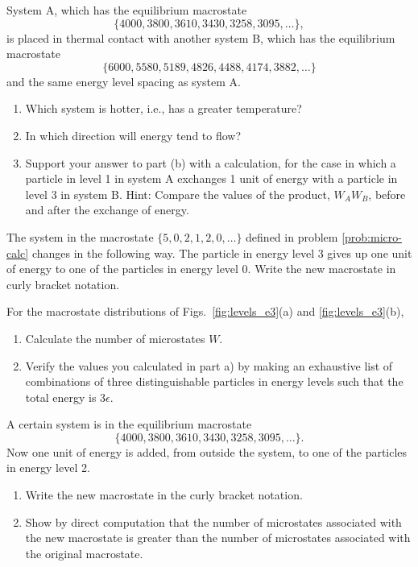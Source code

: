 \begin{problem}
  System A, which has the equilibrium macrostate 
  \[\{4000, 3800, 3610,3430, 3258,3095, \dots\},\] 
   is placed in thermal contact with another
  system B, which has the equilibrium macrostate 
  \[\{6000, 5580, 5189,4826, 4488, 4174, 3882, \dots\}\] 
   and the same energy level spacing
  as system A.
  \begin{enumerate}
  \item Which system is hotter, i.e., has a greater temperature?
  \item In which direction will energy tend to flow?
  \item Support your answer to part (b) with a calculation, for the
    case in which a particle in level 1 in system A exchanges 1 unit
    of energy with a particle in level 3 in system B.  Hint: Compare
    the values of the product, $W_AW_B$, before and after the exchange
    of energy.
  \end{enumerate}
  \label{prob:systemsAB}
\end{problem}


\begin{problem}
  The system in the macrostate $\{5, 0, 2, 1, 2, 0, \dots\}$ defined
  in problem \ref{prob:micro-calc} changes in the following way.  The
  particle in energy level 3 gives up one unit of energy to one of the
  particles in energy level 0.  Write the new macrostate in curly
  bracket notation.
  \label{prob:new_macrostate}
\end{problem}

\begin{problem}
  For the macrostate distributions of Figs.~\ref{fig:levels_e3}(a) and
  \ref{fig:levels_e3}(b),
  \begin{enumerate}
  \item Calculate the number of microstates $W$.
  \item Verify the values you calculated in part a) by making an
    exhaustive list of combinations of three distinguishable particles
    in energy levels such that the total energy is 3$\epsilon$.
  \end{enumerate}
  \label{prob:exhaustive_list}
\end{problem}



\begin{problem}
  A certain system is in the equilibrium macrostate 
  \[\{4000, 3800,3610, 3430, 3258, 3095, \dots\}.\]  
   Now one unit of energy is added,
  from outside the system, to one of the particles in energy level 2.
  \begin{enumerate}
  \item Write the new macrostate in the curly bracket notation.
  \item Show by direct computation that the number of microstates
    associated with the new macrostate is greater than the number of
    microstates associated with the original macrostate.
  \end{enumerate}
\end{problem}

